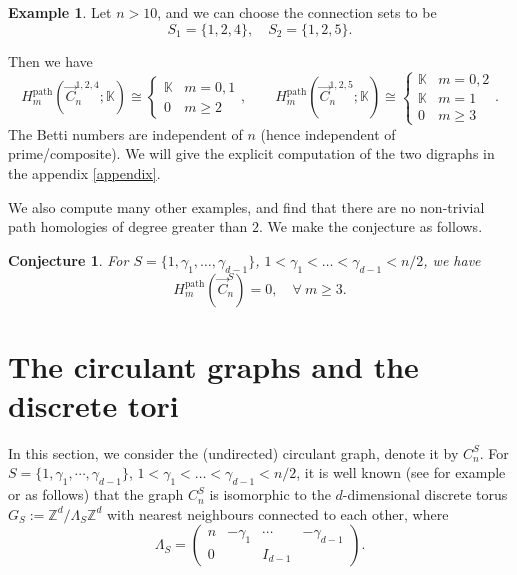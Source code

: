 \documentclass[11pt]{amsart}
\newcommand{\Z}{\mathbb Z}
\newcommand{\K}{\mathbb K}
\theoremstyle{plain}
\newtheorem{conjecture}[theorem]{Conjecture}
\theoremstyle{definition}
\newtheorem{example}[theorem]{Example}
\numberwithin{equation}{section}
\begin{document}
\begin{example}\label{ex:Cn124125}
Let $n>10$, and we can choose the connection sets to be
\[S_1=\{1,2,4\},\quad S_2=\{1,2,5\}.\]

Then we have
\begin{equation}\label{eq:Cn124125}
    H_m^{\mathrm{path}}(\vec{C}_n^{1,2,4};\K)\cong\begin{cases}
        \K & m=0,1\\
        0 & m\ge2
    \end{cases},
    \qquad
    H_m^{\mathrm{path}}(\vec{C}_n^{1,2,5};\K)\cong\begin{cases}
        \K & m=0,2\\
        \K & m=1\\
        0 & m\ge3
    \end{cases}.
\end{equation}
The Betti numbers are independent of $n$ (hence independent of prime/composite). We will give the explicit computation of the two digraphs in the appendix \ref{appendix}.
\end{example}




We also compute many other examples, and find that there are no non-trivial path homologies of degree greater than $2$. We make the conjecture as follows.

\begin{conjecture}
For $S=\{1,\gamma_1,\ldots,\gamma_{d-1}\}$, $1<\gamma_1<\ldots<\gamma_{d-1}<n/2$, we have
\[H_m^{\mathrm{path}}(\vec{C}_n^S)=0,\quad \forall~ m\geq 3.\]
\end{conjecture}



\bigskip
\section{The circulant graphs and the discrete tori}\label{sec:circulantgraph}

In this section, we consider the (undirected) circulant graph,  denote it by $C_n^S$. For $S=\{1,\gamma_1,\cdots,\gamma_{d-1}\}$, $1<\gamma_1<\ldots<\gamma_{d-1}<n/2$, it is well known (see \cite{Louis} for example or as follows) that the graph $C_n^S$ is isomorphic to the $d$-dimensional discrete torus $G_S:=\Z^d/\Lambda_S\Z^d$ with nearest neighbours connected to each other, where
\[
\Lambda_S=\begin{pmatrix}
n & -\gamma_1 & \cdots & -\gamma_{d-1}\\
0 & & I_{d-1} &
\end{pmatrix}.
\]
\end{document}
